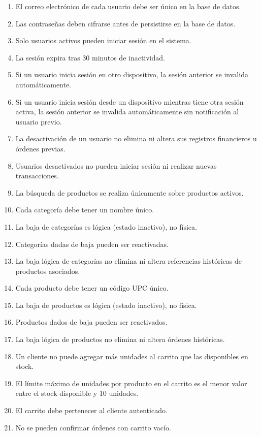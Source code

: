 \documentclass[12pt,a4paper]{article}
\begin{document}
\begin{enumerate}[label=RN\arabic*:]
    \item El correo electrónico de cada usuario debe ser único en la base de datos.
    \item Las contraseñas deben cifrarse antes de persistirse en la base de datos.
    \item Solo usuarios activos pueden iniciar sesión en el sistema.
    \item La sesión expira tras 30 minutos de inactividad.
    \item Si un usuario inicia sesión en otro dispositivo, la sesión anterior se invalida automáticamente.
    \item Si un usuario inicia sesión desde un dispositivo mientras tiene otra sesión activa, la sesión anterior se invalida automáticamente sin notificación al usuario previo.
    \item La desactivación de un usuario no elimina ni altera sus registros financieros u órdenes previas.
    \item Usuarios desactivados no pueden iniciar sesión ni realizar nuevas transacciones.
    \item La búsqueda de productos se realiza únicamente sobre productos activos.
    \item Cada categoría debe tener un nombre único.
    \item La baja de categorías es lógica (estado inactivo), no física.
    \item Categorías dadas de baja pueden ser reactivadas.
    \item La baja lógica de categorías no elimina ni altera referencias históricas de productos asociados.
    \item Cada producto debe tener un código UPC único.
    \item La baja de productos es lógica (estado inactivo), no física.
    \item Productos dados de baja pueden ser reactivados.
    \item La baja lógica de productos no elimina ni altera órdenes históricas.
    \item Un cliente no puede agregar más unidades al carrito que las disponibles en stock.
    \item El límite máximo de unidades por producto en el carrito es el menor valor entre el stock disponible y 10 unidades.
    \item El carrito debe pertenecer al cliente autenticado.
    \item No se pueden confirmar órdenes con carrito vacío.

\end{enumerate}
\end{document}
